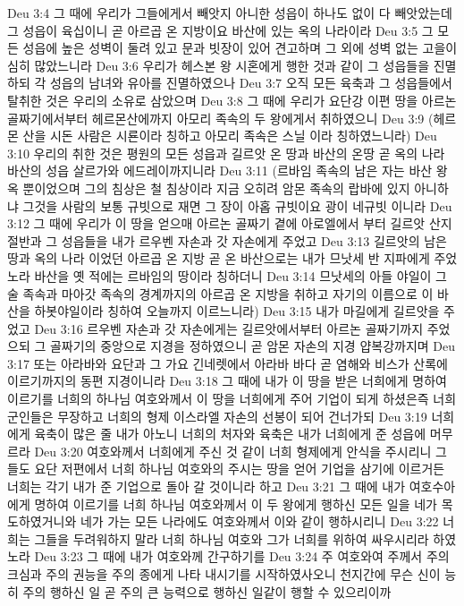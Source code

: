 Deu 3:4  그 때에 우리가 그들에게서 빼앗지 아니한 성읍이 하나도 없이 다 빼앗았는데 그 성읍이 육십이니 곧 아르곱 온 지방이요 바산에 있는 옥의 나라이라
Deu 3:5  그 모든 성읍에 높은 성벽이 둘려 있고 문과 빗장이 있어 견고하며 그 외에 성벽 없는 고을이 심히 많았느니라
Deu 3:6  우리가 헤스본 왕 시혼에게 행한 것과 같이 그 성읍들을 진멸하되 각 성읍의 남녀와 유아를 진멸하였으나
Deu 3:7  오직 모든 육축과 그 성읍들에서 탈취한 것은 우리의 소유로 삼았으며
Deu 3:8  그 때에 우리가 요단강 이편 땅을 아르논 골짜기에서부터 헤르몬산에까지 아모리 족속의 두 왕에게서 취하였으니
Deu 3:9  (헤르몬 산을 시돈 사람은 시룐이라 칭하고 아모리 족속은 스닐 이라 칭하였느니라)
Deu 3:10  우리의 취한 것은 평원의 모든 성읍과 길르앗 온 땅과 바산의 온땅 곧 옥의 나라 바산의 성읍 살르가와 에드레이까지니라
Deu 3:11  (르바임 족속의 남은 자는 바산 왕 옥 뿐이었으며 그의 침상은 철 침상이라 지금 오히려 암몬 족속의 랍바에 있지 아니하냐 그것을 사람의 보통 규빗으로 재면 그 장이 아홉 규빗이요 광이 네규빗 이니라
Deu 3:12  그 때에 우리가 이 땅을 얻으매 아르논 골짜기 곁에 아로엘에서 부터 길르앗 산지 절반과 그 성읍들을 내가 르우벤 자손과 갓 자손에게 주었고
Deu 3:13  길르앗의 남은 땅과 옥의 나라 이었던 아르곱 온 지방 곧 온 바산으로는 내가 므낫세 반 지파에게 주었노라 바산을 옛 적에는 르바임의 땅이라 칭하더니
Deu 3:14  므낫세의 아들 야일이 그술 족속과 마아갓 족속의 경계까지의 아르곱 온 지방을 취하고 자기의 이름으로 이 바산을 하봇야일이라 칭하여 오늘까지 이르느니라)
Deu 3:15  내가 마길에게 길르앗을 주었고
Deu 3:16  르우벤 자손과 갓 자손에게는 길르앗에서부터 아르논 골짜기까지 주었으되 그 골짜기의 중앙으로 지경을 정하였으니 곧 암몬 자손의 지경 얍복강까지며
Deu 3:17  또는 아라바와 요단과 그 가요 긴네렛에서 아라바 바다 곧 염해와 비스가 산록에 이르기까지의 동편 지경이니라
Deu 3:18  그 때에 내가 이 땅을 받은 너희에게 명하여 이르기를 너희의 하나님 여호와께서 이 땅을 너희에게 주어 기업이 되게 하셨은즉 너희 군인들은 무장하고 너희의 형제 이스라엘 자손의 선봉이 되어 건너가되
Deu 3:19  너희에게 육축이 많은 줄 내가 아노니 너희의 처자와 육축은 내가 너희에게 준 성읍에 머무르라
Deu 3:20  여호와께서 너희에게 주신 것 같이 너희 형제에게 안식을 주시리니 그들도 요단 저편에서 너희 하나님 여호와의 주시는 땅을 얻어 기업을 삼기에 이르거든 너희는 각기 내가 준 기업으로 돌아 갈 것이니라 하고
Deu 3:21  그 때에 내가 여호수아에게 명하여 이르기를 너희 하나님 여호와께서 이 두 왕에게 행하신 모든 일을 네가 목도하였거니와 네가 가는 모든 나라에도 여호와께서 이와 같이 행하시리니
Deu 3:22  너희는 그들을 두려워하지 말라 너희 하나님 여호와 그가 너희를 위하여 싸우시리라 하였노라
Deu 3:23  그 때에 내가 여호와께 간구하기를
Deu 3:24  주 여호와여 주께서 주의 크심과 주의 권능을 주의 종에게 나타 내시기를 시작하였사오니 천지간에 무슨 신이 능히 주의 행하신 일 곧 주의 큰 능력으로 행하신 일같이 행할 수 있으리이까
